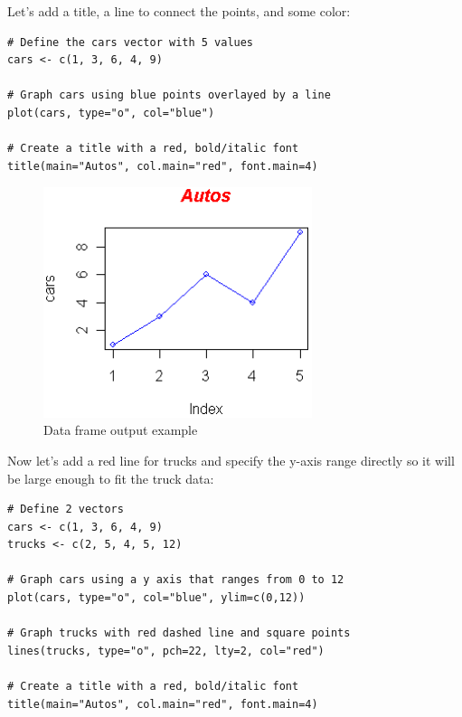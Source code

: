 \documentclass[10pt]{book}
\begin{document}
Let's add a title, a line to connect the points, and some color:

\begin{lstlisting}
# Define the cars vector with 5 values
cars <- c(1, 3, 6, 4, 9)

# Graph cars using blue points overlayed by a line 
plot(cars, type="o", col="blue")

# Create a title with a red, bold/italic font
title(main="Autos", col.main="red", font.main=4)
\end{lstlisting}
\begin{figure}[H]
    \begin{flushleft}
        \includegraphics[width=0.7\textwidth]{line_script2.png}
        \caption{Data frame output example}
        \label{fig:dataframe}
    \end{flushleft}
\end{figure}

Now let's add a red line for trucks and specify the y-axis range directly so it will be large enough to fit the truck data:

\begin{lstlisting}
# Define 2 vectors
cars <- c(1, 3, 6, 4, 9)
trucks <- c(2, 5, 4, 5, 12)

# Graph cars using a y axis that ranges from 0 to 12
plot(cars, type="o", col="blue", ylim=c(0,12))

# Graph trucks with red dashed line and square points
lines(trucks, type="o", pch=22, lty=2, col="red")

# Create a title with a red, bold/italic font
title(main="Autos", col.main="red", font.main=4)
\end{lstlisting}
\end{document}
